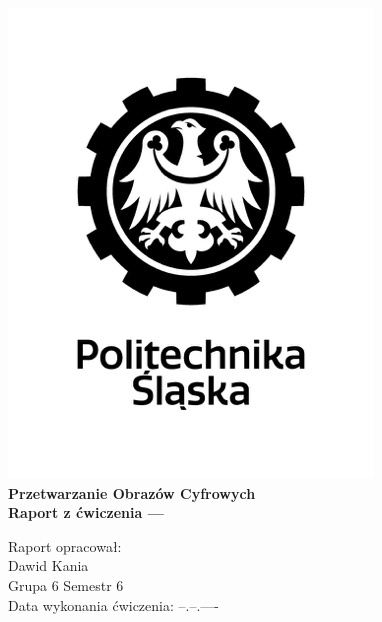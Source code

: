 
\begin{titlepage}
    \begin{center}
        \includegraphics[width=.50\linewidth]{other/polsl.png}\\
        \Huge
        \textbf{Przetwarzanie Obrazów Cyfrowych}
        \\ \vspace{1.5cm}
        \Large
        \textbf{Raport z ćwiczenia ---}        
    \end{center}
    \vspace{3.0cm}
    \Large
    Raport opracował: \\
    Dawid Kania \\
    Grupa 6 Semestr 6 \\
    Data wykonania ćwiczenia: --.--.----
\end{titlepage}
